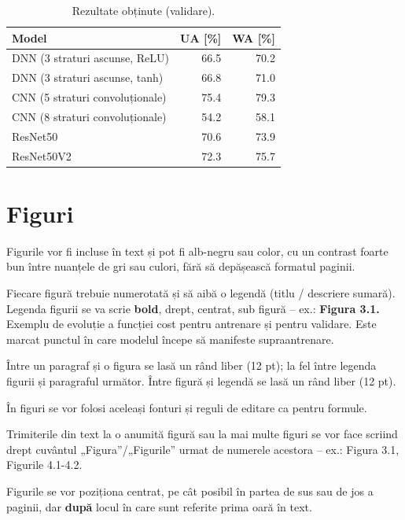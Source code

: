 \begin{table}
\centering
\caption{Rezultate obținute (validare).}
\label{comp}
\begin{tabular}{|l|r|r|}
\hline
\textbf{Model}                    & \textbf{UA [\%]} & \textbf{WA [\%]}  \\\hline
DNN (3 straturi
  ascunse, ReLU)  & 66.5             & 70.2              \\\hline
DNN (3 straturi
  ascunse, tanh)  & 66.8             & 71.0              \\\hline
CNN (5 straturi
  convoluționale) & 75.4             & 79.3              \\\hline
CNN (8 straturi
  convoluționale) & 54.2             & 58.1              \\\hline
ResNet50                          & 70.6             & 73.9              \\\hline
ResNet50V2                        & 72.3             & 75.7             \\\hline
\end{tabular}
\end{table}

\section{Figuri}

Figurile vor fi incluse în text și pot fi alb-negru sau color, cu un contrast foarte bun între nuanțele de gri sau culori, fără să depășească formatul paginii.

Fiecare figură trebuie numerotată și să aibă o legendă (titlu / descriere sumară). Legenda figurii se va scrie \textbf{bold}, drept, centrat, sub figură – ex.: \textbf{Figura 3.1.} Exemplu de evoluție a funcției cost pentru antrenare și pentru validare. Este marcat punctul în care modelul începe să manifeste supraantrenare.

Între un paragraf și o figura se lasă un rând liber (12 pt); la fel între legenda figurii și paragraful următor. Între figură și legendă se lasă un rând liber (12 pt).

În figuri se vor folosi aceleași fonturi și reguli de editare ca pentru formule.

Trimiterile din text la o anumită figură sau la mai multe figuri se vor face scriind drept cuvântul „Figura”/„Figurile” urmat de numerele acestora – ex.: Figura 3.1, Figurile 4.1-4.2.

Figurile se vor poziționa centrat, pe cât posibil în partea de sus sau de jos a paginii, dar \textbf{după} locul în care sunt referite prima oară în text.
	
